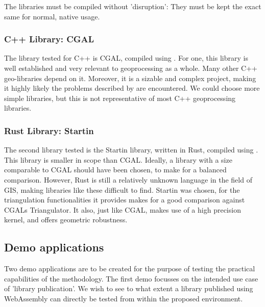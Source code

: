 The libraries must be compiled without 'disruption': They must be kept the exact same for normal, native usage. 

\subsubsection{C++ Library: CGAL} 
The library tested for C++ is CGAL, compiled using . 
For one, this library is well established and very relevant to geoprocessing as a whole. 
Many other C++ geo-libraries depend on it.
Moreover, it is a sizable and complex project, making it highly likely the problems described by  are encountered. 
We could choose more simple libraries, but this is not representative of most C++ geoprocessing libraries. 


\subsubsection{Rust Library: Startin}
The second library tested is the Startin library, written in Rust, compiled using .  
This library is smaller in scope than CGAL. 
Ideally, a library with a size comparable to CGAL should have been chosen, to make for a balanced comparison. 
However, Rust is still a relatively unknown language in the field of GIS, making libraries like these difficult to find. 
Startin was chosen, for the triangulation functionalities it provides makes for a good comparison against CGALs Triangulator. 
It also, just like CGAL, makes use of a high precision kernel, and offers geometric robustness. 

\subsection{Demo applications}

Two demo applications are to be created for the purpose of testing the practical capabilities of the methodology. 
The first demo focusses on the intended use case of 'library publication'. 
We wish to see to what extent a library published using WebAssembly can directly be tested from within the proposed environment. 

